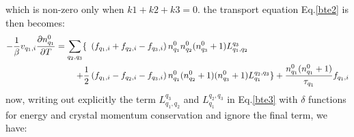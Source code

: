 \documentclass{article}
\newcommand{\pfrac}[2]{\frac{\partial #1}{\partial #2}}
\begin{document}
which is non-zero only when $k1 + k2 + k3 = 0$. 
the transport equation Eq.\ref{bte2} is then becomes:
\begin{align}
    - \frac{1}{\beta} v_{q_1,i} \pfrac{n_{q_1}^0}{T} = 
    \sum_{q_2,q_3} \{\ &\left( f_{q_1,i} + f_{q_2,i} - f_{q_3,i} \right) n_{q_1}^0 n_{q_2}^0 (n_{q_3}^0 + 1) L_{q_1,q_2}^{q_3} \notag \\
      + \frac{1}{2} &\left( f_{q_1,i} - f_{q_2,i} - f_{q_3,i} \right) n_{q_1}^0 (n_{q_2}^0+1) (n_{q_3}^0 + 1) L^{q_2,q_3}_{q_1}\} 
      + \frac{n_{q_1}^0(n_{q_1}^0+1)}{\tau_{q_1}} f_{q_1,i} \label{bte3} 
\end{align}
now, writing out explicitly the term $L_{q_1,q_2}^{q_3}$ and $L^{q_2,q_3}_{q_1}$ in Eq.\ref{bte3} 
with $\delta$ functions for energy and crystal momentum conservation and ignore the final term, we have:
\end{document}

